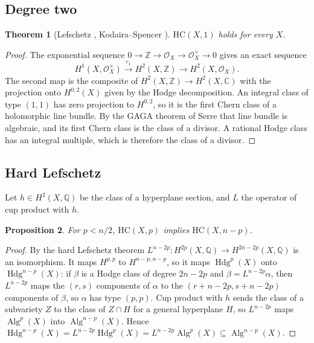 \documentclass[11pt]{amsart}
\newtheorem{theorem}{Theorem}[section]
\newtheorem{proposition}[theorem]{Proposition}
\theoremstyle{definition}
\theoremstyle{remark}
\newcommand{\QQ}{\mathbb{Q}}
\newcommand{\ZZ}{\mathbb{Z}}
\newcommand{\CC}{\mathbb{C}}
\newcommand{\cO}{\mathcal{O}}
\newcommand{\Hdg}{\operatorname{Hdg}}
\newcommand{\Alg}{\operatorname{Alg}}
\newcommand{\HC}{\mathrm{HC}}
\begin{document}
\subsection{Degree two}

\begin{theorem}[Lefschetz {\cite{Lef24}}, Kodaira--Spencer {\cite{KS53}}]\label{thm:lef11}
$\HC(X,1)$ holds for every $X$.
\end{theorem}

\begin{proof}
The exponential sequence $0\to\ZZ\to\cO_{X}\to\cO_{X}^{\times}\to0$ gives an
exact sequence
\[
  H^{1}(X,\cO_{X}^{\times})\xrightarrow{\;c_{1}\;}H^{2}(X,\ZZ)\longrightarrow
  H^{2}(X,\cO_{X}).
\]
The second map is the composite of $H^{2}(X,\ZZ)\to H^{2}(X,\CC)$ with the
projection onto $H^{0,2}(X)$ given by the Hodge decomposition. An integral
class of type $(1,1)$ has zero projection to $H^{0,2}$, so it is the first
Chern class of a holomorphic line bundle. By the GAGA theorem of Serre that
line bundle is algebraic, and its first Chern class is the class of a divisor.
A rational Hodge class has an integral multiple, which is therefore the class
of a divisor.
\end{proof}

\subsection{Hard Lefschetz}

Let $h\in H^{2}(X,\QQ)$ be the class of a hyperplane section, and $L$ the
operator of cup product with $h$.

\begin{proposition}\label{prop:hardlef}
For $p<n/2$, $\HC(X,p)$ implies $\HC(X,n-p)$.
\end{proposition}

\begin{proof}
By the hard Lefschetz theorem $L^{n-2p}\colon H^{2p}(X,\QQ)\to
H^{2n-2p}(X,\QQ)$ is an isomorphism. It maps $H^{p,p}$ to $H^{n-p,n-p}$, so
it maps $\Hdg^{p}(X)$ onto $\Hdg^{n-p}(X)$: if $\beta$ is a Hodge class of
degree $2n-2p$ and $\beta=L^{n-2p}\alpha$, then $L^{n-2p}$ maps the $(r,s)$
components of $\alpha$ to the $(r+n-2p,s+n-2p)$ components of $\beta$, so
$\alpha$ has type $(p,p)$. Cup product with $h$ sends the class of a
subvariety $Z$ to the class of $Z\cap H$ for a general hyperplane $H$, so
$L^{n-2p}$ maps $\Alg^{p}(X)$ into $\Alg^{n-p}(X)$. Hence
$\Hdg^{n-p}(X)=L^{n-2p}\Hdg^{p}(X)=L^{n-2p}\Alg^{p}(X)\subseteq\Alg^{n-p}(X)$.
\end{proof}
\end{document}
